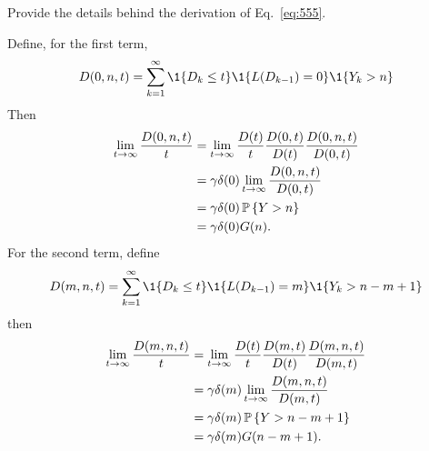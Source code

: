 \begin{question}\label{q:555}
Provide the details behind the derivation of Eq.~\ref{eq:555}.
\begin{solution}
Define, for the first term,
\begin{equation*}
  D(0, n, t) = \sum_{k=1}^\infty \1{D_{k}\leq t}\1{L(D_{k-1})=0}\1{Y_k>n}
\end{equation*}
Then
\begin{equation*}
  \begin{split}
  \lim_{t\to\infty} \frac{  D(0, n, t)}t 
&=   \lim_{t\to\infty}  \frac{D(t)}t \frac{D(0, t)}{D(t)}\frac{ D(0, n, t)}{D(0,t)} \\
&=   \gamma \delta(0) \lim_{t\to\infty} \frac{ D(0, n, t)}{D(0,t)} \\
&=   \gamma \delta(0) \P{Y>n}\\
& = \gamma \delta(0) G(n).
  \end{split}
\end{equation*}
For the second term, define
\begin{equation*}
  D(m, n, t) = \sum_{k=1}^\infty \1{D_{k}\leq t}\1{L(D_{k-1})=m}\1{Y_k>n-m+1}
\end{equation*}
then
\begin{equation*}
  \begin{split}
  \lim_{t\to\infty} \frac{  D(m, n, t)}t 
&=   \lim_{t\to\infty}  \frac{D(t)}t \frac{D(m, t)}{D(t)}\frac{ D(m, n, t)}{D(m,t)} \\
&=   \gamma \delta(m) \lim_{t\to\infty} \frac{ D(m, n, t)}{D(m,t)} \\
&=   \gamma \delta(m) \P{Y>n-m+1}\\
& = \gamma \delta(m) G(n-m+1).
  \end{split}
\end{equation*}


\end{solution}
\end{question}


